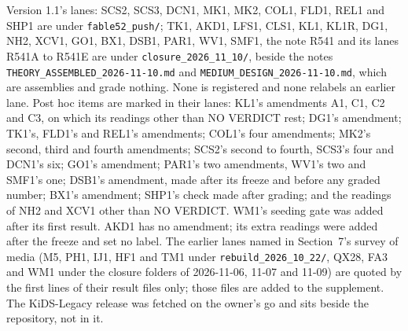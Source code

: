 \documentclass[10pt]{article}
\begin{document}
Version 1.1's lanes: SCS2, SCS3, DCN1, MK1, MK2, COL1, FLD1, REL1 and SHP1 are under \texttt{fable52\_push/}; TK1, AKD1, LFS1, CLS1, KL1, KL1R, DG1, NH2, XCV1, GO1, BX1, DSB1, PAR1, WV1, SMF1, the note R541 and its lanes R541A to R541E are under \texttt{closure\_2026\_11\_10/}, beside the notes \texttt{THEORY\_ASSEMBLED\_2026-11-10.md} and \texttt{MEDIUM\_DESIGN\_2026-11-10.md}, which are assemblies and grade nothing. None is registered and none relabels an earlier lane. Post hoc items are marked in their lanes: KL1's amendments A1, C1, C2 and C3, on which its readings other than NO VERDICT rest; DG1's amendment; TK1's, FLD1's and REL1's amendments; COL1's four amendments; MK2's second, third and fourth amendments; SCS2's second to fourth, SCS3's four and DCN1's six; GO1's amendment; PAR1's two amendments, WV1's two and SMF1's one; DSB1's amendment, made after its freeze and before any graded number; BX1's amendment; SHP1's check made after grading; and the readings of NH2 and XCV1 other than NO VERDICT. WM1's seeding gate was added after its first result. AKD1 has no amendment; its extra readings were added after the freeze and set no label. The earlier lanes named in Section~7's survey of media (M5, PH1, IJ1, HF1 and TM1 under \texttt{rebuild\_2026\_10\_22/}, QX28, FA3 and WM1 under the closure folders of 2026-11-06, 11-07 and 11-09) are quoted by the first lines of their result files only; those files are added to the supplement. The KiDS-Legacy release was fetched on the owner's go and sits beside the repository, not in it.
\end{document}
